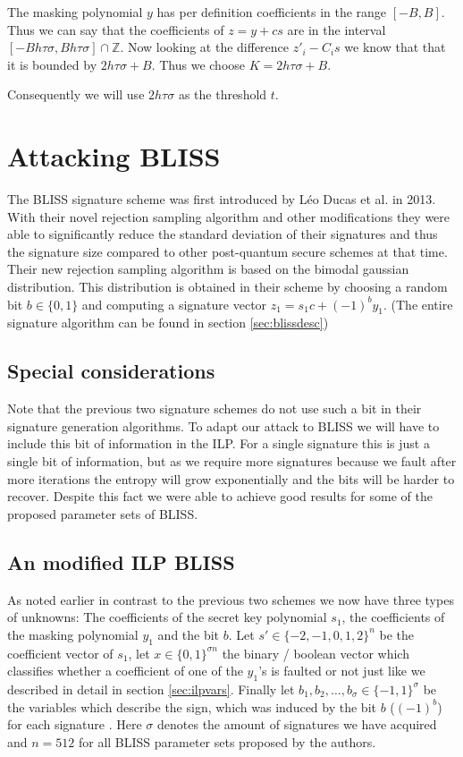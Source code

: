 \documentclass[a4paper,titlepage]{article}
\begin{document}
The masking polynomial $y$ has per definition coefficients in the range $[-B, B]$. Thus we can say that the coefficients of $z = y+cs$ are in the interval $[-B h \tau \sigma, B h \tau \sigma] \cap \mathds{Z}$.
Now looking at the difference $z'_{i} - C_{i}s$ we know that that it is bounded by $2 h \tau \sigma + B$. Thus we choose $K = 2 h \tau \sigma + B$.

Consequently we will use $2 h \tau \sigma$ as the threshold $t$.


\section{Attacking BLISS}
The BLISS \cite{bliss} signature scheme was first introduced by Léo Ducas et al. in 2013. With their novel rejection sampling algorithm and other modifications they were able to significantly reduce the standard deviation of their signatures and thus the signature size compared to other post-quantum secure schemes at that time. Their new rejection sampling algorithm is based on the bimodal gaussian distribution. This distribution is obtained in their scheme by choosing a random bit $b \in \{0, 1\}$ and computing a signature vector $z_{1} = s_{1}c + (-1)^{b} y_{1}$. (The entire signature algorithm can be found in section \ref{sec:blissdesc})


\subsection{Special considerations}
Note that the previous two signature schemes do not use such a bit in their signature generation algorithms. To adapt our attack to BLISS we will have to include this bit of information in the ILP.
For a single signature this is just a single bit of information, but as we require more signatures because we fault after more iterations the entropy will grow exponentially and the bits will be harder to recover.
Despite this fact we were able to achieve good results for some of the proposed parameter sets of BLISS.

\subsection{An modified ILP BLISS}
As noted earlier in contrast to the previous two schemes we now have three types of unknowns: The coefficients of the secret key polynomial $s_{1}$, the coefficients of the masking polynomial $y_{1}$ and the bit $b$.  Let $s' \in \{-2, -1, 0, 1, 2\}^{n}$ be the coefficient vector of $s_{1}$, let $x \in \{0, 1\}^{\sigma n}$ the binary / boolean vector which classifies whether a coefficient of one of the $y_{1}$'s is faulted or not just like we described in detail in section \ref{sec:ilpvars}. Finally let $b_{1},  b_{2}, \ldots, b_{\sigma} \in \{-1, 1\}^{\sigma}$ be the variables which describe the sign, which was induced by the bit $b$ ($(-1)^{b}$) for each signature .
Here $\sigma$ denotes the amount of signatures we have acquired and $n=512$ for all BLISS parameter sets proposed by the authors.
\end{document}

